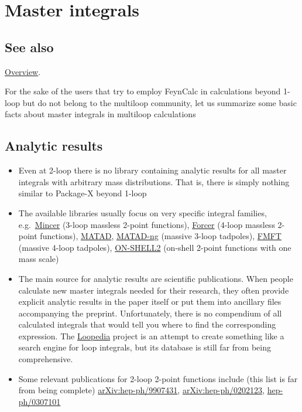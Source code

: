 \documentclass[../FeynCalcManual.tex]{subfiles}
\begin{document}
\hypertarget{master-integrals}{%
\section{Master integrals}\label{master-integrals}}

\subsection{See also}

\hyperlink{toc}{Overview}.

For the sake of the users that try to employ FeynCalc in calculations
beyond 1-loop but do not belong to the multiloop community, let us
summarize some basic facts about master integrals in multiloop
calculations

\hypertarget{analytic-results}{%
\subsection{Analytic results}\label{analytic-results}}

\begin{itemize}
\item
  Even at 2-loop there is no library containing analytic results for all
  master integrals with arbitrary mass distributions. That is, there is
  simply nothing similar to Package-X beyond 1-loop
\item
  The available libraries usually focus on very specific integral
  families,
  e.g.~\href{https://www.nikhef.nl/~form/maindir/packages/mincer/mincer.html}{Mincer}
  (3-loop massless 2-point functions),
  \href{https://github.com/benruijl/forcer}{Forcer} (4-loop massless
  2-point functions),
  \href{https://www.ttp.kit.edu/~ms/software.html}{MATAD},
  \href{https://github.com/apik/matad-ng}{MATAD-ng} (massive 3-loop
  tadpoles), \href{https://github.com/apik/fmft}{FMFT} (massive 4-loop
  tadpoles),
  \href{http://theor.jinr.ru/~kalmykov/onshell2/onshell2.html}{ON-SHELL2}
  (on-shell 2-point functions with one mass scale)
\item
  The main source for analytic results are scientific publications. When
  people calculate new master integrals needed for their research, they
  often provide explicit analytic results in the paper itself or put
  them into ancillary files accompanying the preprint. Unfortunately,
  there is no compendium of all calculated integrals that would tell you
  where to find the corresponding expression. The
  \href{https://arxiv.org/abs/1709.01266}{Loopedia} project is an
  attempt to create something like a search engine for loop integrals,
  but its database is still far from being comprehensive.
\item
  Some relevant publications for 2-loop 2-point functions include (this
  list is far from being complete)
  \href{https://arxiv.org/abs/hep-ph/9907431}{arXiv:hep-ph/9907431},
  \href{https://arxiv.org/abs/hep-ph/0202123v2}{arXiv:hep-ph/0202123},
  \href{https://arxiv.org/abs/hep-ph/0307101v1}{hep-ph/0307101}
\end{itemize}
\end{document}
